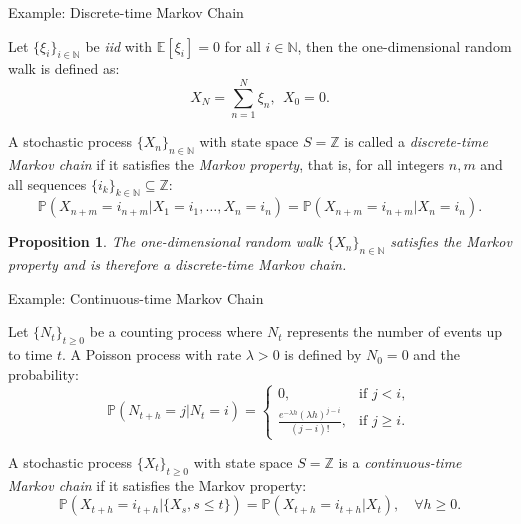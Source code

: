 \documentclass[aspectratio=169,xcolor=dvipsnames]{beamer}
\newtheorem{proposition}{Proposition}
\begin{document}
\begin{frame}{Example: Discrete-time Markov Chain}
    \begin{example}
        Let $\{\xi_i\}_{i \in \mathbb{N}}$ be \textit{iid} with $\mathbb{E}[\xi_i] = 0$ for all $i \in \mathbb{N}$, then the one-dimensional random walk is defined as:
        $$
        X_N = \sum_{n=1}^N \xi_n,\ \ X_0 = 0.
        $$
    \end{example}

    \begin{definition}
        A stochastic process $\{X_n\}_{n \in \mathbb{N}}$ with state space $S = \mathbb{Z}$ is called a \textit{discrete-time Markov chain} if it satisfies the \textit{Markov property}, that is, for all integers $n, m$ and all sequences $\{i_k\}_{k \in \mathbb{N}} \subseteq \mathbb{Z}$:
        $$
        \mathbb{P}( X_{n+m} = i_{n+m} | X_1 = i_1, \ldots, X_n = i_n) = \mathbb{P}(X_{n+m} = i_{n+m} | X_n = i_n).
        $$
    \end{definition}
\end{frame}
\begin{frame}
    \begin{proposition}
    The one-dimensional random walk $\{X_n\}_{n \in \mathbb{N}}$ satisfies the Markov property and is therefore a discrete-time Markov chain.
    \end{proposition}
\end{frame}

\begin{frame}{Example: Continuous-time Markov Chain}
    \begin{example}
        Let $\{N_t\}_{t \geq 0}$ be a counting process where $N_t$ represents the number of events up to time $t$. A Poisson process with rate $\lambda > 0$ is defined by $N_0 = 0$ and the probability:
        $$
        \mathbb{P}(N_{t+h} = j | N_t = i) =
        \begin{cases}
            0, & \text{if } j < i, \\
            \frac{e^{-\lambda h} (\lambda h)^{j-i}}{(j-i)!}, & \text{if } j \geq i.
        \end{cases}
        $$
    \end{example}

    \begin{definition}
        A stochastic process $\{X_t\}_{t \geq 0}$ with state space $S = \mathbb{Z}$ is a \textit{continuous-time Markov chain} if it satisfies the Markov property:
        $$
        \mathbb{P}(X_{t+h} = i_{t+h} | \{X_s, s \leq t\}) = \mathbb{P}(X_{t+h} = i_{t+h} | X_t), \quad \forall h \geq 0.
        $$
    \end{definition}
\end{frame}
\end{document}
